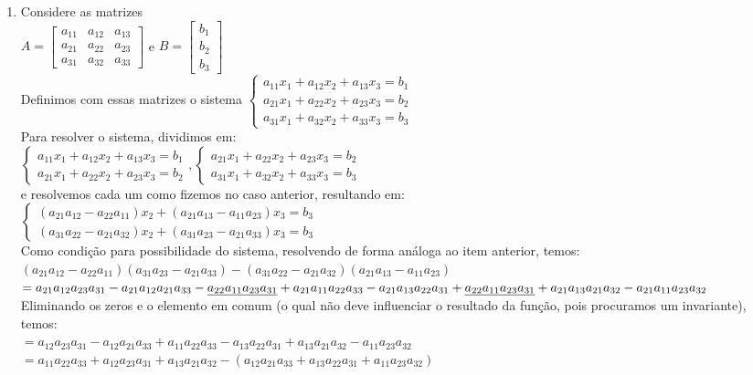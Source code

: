 \documentclass[12pt]{article}
\begin{document}
\begin{enumerate}
	\item Considere as matrizes\\
	$A = \begin{bmatrix}
	a_{11} & a_{12} & a_{13} \\ a_{21} & a_{22} & a_{23} \\ a_{31} & a_{32} & a_{33} \end{bmatrix}$ e $B = \begin{bmatrix} b_1 \\ b_2 \\ b_3 \end{bmatrix}$\\ Definimos com essas matrizes o sistema $\begin{cases} a_{11}x_1 + a_{12}x_2 + a_{13}x_3 = b_1 \\ a_{21}x_1 + a_{22}x_2 + a_{23}x_3 = b_2 \\ a_{31}x_1 + a_{32}x_2 + a_{33}x_3 = b_3 \end{cases}$\\[10pt]
	Para resolver o sistema, dividimos em: \\[10pt] $\begin{cases} a_{11}x_1 + a_{12}x_2 + a_{13}x_3 = b_1 \\ a_{21}x_1 + a_{22}x_2 + a_{23}x_3 = b_2\end{cases},\begin{cases} a_{21}x_1 + a_{22}x_2 + a_{23}x_3 = b_2 \\ a_{31}x_1 + a_{32}x_2 + a_{33}x_3 = b_3 \end{cases}$\\[10pt] e resolvemos cada um como fizemos no caso anterior, resultando em:\\[10pt] $\begin{cases} (a_{21}a_{12} - a_{22}a_{11})x_2 + (a_{21}a_{13} - a_{11}a_{23})x_3 = b_3 \\ (a_{31}a_{22} - a_{21}a_{32})x_2 + (a_{31}a_{23} - a_{21}a_{33})x_3 = b_3 \end{cases}$ \\[10pt]
	Como condição para possibilidade do sistema, resolvendo de forma análoga ao item anterior, temos:\\
	$(a_{21}a_{12} - a_{22}a_{11})(a_{31}a_{23} - a_{21}a_{33}) - (a_{31}a_{22} - a_{21}a_{32})(a_{21}a_{13} - a_{11}a_{23})$
	\\[5pt]
	$= a_{21}a_{12}a_{23}a_{31} - a_{21}a_{12}a_{21}a_{33} - \underline{a_{22}a_{11}a_{23}a_{31}} + a_{21}a_{11}a_{22}a_{33} \\	
	- a_{21}a_{13}a_{22}a_{31} + \underline{a_{22}a_{11}a_{23}a_{31}} + a_{21}a_{13}a_{21}a_{32} - a_{21}a_{11}a_{23}a_{32}$ \\[10pt]
	Eliminando os zeros e o elemento em comum (o qual não deve influenciar o resultado da função, pois procuramos um invariante), temos:\\
	$= a_{12}a_{23}a_{31} - a_{12}a_{21}a_{33} + a_{11}a_{22}a_{33} - a_{13}a_{22}a_{31} + a_{13}a_{21}a_{32} - a_{11}a_{23}a_{32}$\\[10pt]
	$= a_{11}a_{22}a_{33} + a_{12}a_{23}a_{31} + a_{13}a_{21}a_{32} - (a_{12}a_{21}a_{33} + a_{13}a_{22}a_{31} + a_{11}a_{23}a_{32})$
\end{enumerate}\
\end{document}
